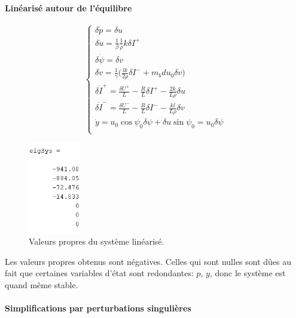\documentclass{report}
\begin{document}
\paragraph{Linéarisé autour de l'équilibre}

\begin{equation*}
    \begin{cases}
        \delta{\dot p} = \delta u \\
        \delta{\dot u} = \frac{1}{\beta}\frac{1}{\rho}k\delta I^{+} \\
        \delta{\dot \psi} = \delta v \\
        \delta{\dot v} = \frac{1}{\gamma}\big( \frac{lk}{2\rho}\delta I^{-} + m_bd u_0 \delta v \big) \\
        \delta{\dot I^{+}} = \frac{\delta U^{+}}{L} - \frac{R}{L}\delta I^{+} - \frac{2k}{L\rho}\delta u \\
        \delta{\dot I^{-}} = \frac{\delta U^{-}}{L} - \frac{R}{L}\delta I^{-} - \frac{kl}{L\rho}\delta v \\
        \dot{y} = u_0\cos\psi_0 \delta \psi + \delta u \sin\psi_0 = u_0 \delta \psi \\
    \end{cases}
\end{equation*}

\begin{figure}[h]  %
    \centering
    \includegraphics[width=0.2\textwidth]{figures/eigSys.png}
    \caption{Valeurs propres du système linéarisé.}
\end{figure}

Les valeurs propres obtenus sont négatives. Celles qui sont nulles sont
dûes au fait que certaines variables d'état sont redondantes: $p$, $y$,
donc le système est quand même stable.


\paragraph{Simplifications par perturbations singulières}
\end{document}
